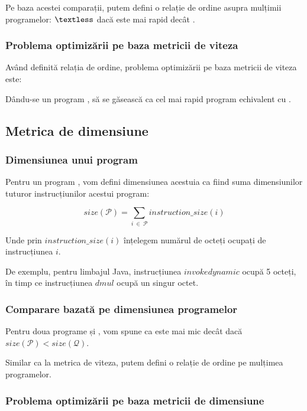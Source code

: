 Pe baza acestei comparații, putem defini o relație de ordine
asupra mulțimii programelor:  $\textless$  dacă 
este mai rapid decât .

\subsubsection{Problema optimizării pe baza metricii de viteza}

Având definită relația de ordine, problema optimizării pe
baza metricii de viteza este:

Dându-se un program , să se găsească  ca cel mai rapid
program echivalent cu .

\subsection{Metrica de dimensiune}

\subsubsection{Dimensiunea unui program}

Pentru un program , vom defini dimensiunea acestuia ca fiind
suma dimensiunilor tuturor instrucțiunilor acestui program:

\[
	size(\mathcal{P}) = \sum_{i\ \in\ \mathcal{P}} instruction\_size(i)
\]

Unde prin \( instruction\_size(i) \) înțelegem numărul de octeți
ocupați de instrucțiunea $i$.

De exemplu, pentru limbajul Java, instrucțiunea $invokedynamic$
ocupă 5 octeți, în timp ce instrucțiunea $dmul$ ocupă un singur
octet.

\subsubsection{Comparare bazată pe dimensiunea programelor}

Pentru doua programe  și , vom spune ca  este mai
mic decât  dacă \(size(\mathcal{P}) < size(\mathcal{Q})\).

Similar ca la metrica de viteza, putem defini o relație de ordine
pe mulțimea programelor.

\subsubsection{Problema optimizării pe baza metricii de
	dimensiune}

